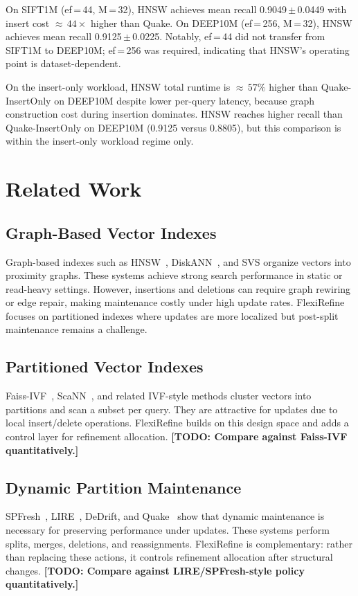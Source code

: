 \documentclass[sigconf, nonacm]{acmart}
\newcommand{\system}{FlexiRefine\xspace}
\newcommand{\quake}{Quake\xspace}
\newcommand{\todo}[1]{\textbf{[TODO: #1]}}
\begin{document}
On SIFT1M (ef\,=\,44, M\,=\,32), HNSW achieves mean recall
0.9049\,$\pm$\,0.0449 with insert cost $\approx\,44\times$ higher
than Quake. On DEEP10M (ef\,=\,256, M\,=\,32), HNSW achieves mean
recall 0.9125\,$\pm$\,0.0225. Notably, ef\,=\,44 did not transfer
from SIFT1M to DEEP10M; ef\,=\,256 was required, indicating that
HNSW's operating point is dataset-dependent.

On the insert-only workload, HNSW total runtime is
$\approx\,57\%$ higher than Quake-InsertOnly on DEEP10M despite lower
per-query latency, because graph construction cost during insertion
dominates. HNSW reaches higher recall than Quake-InsertOnly on
DEEP10M (0.9125 versus 0.8805), but this comparison is within the
insert-only workload regime only.

\section{Related Work}
\label{sec:related}

\subsection{Graph-Based Vector Indexes}
Graph-based indexes such as HNSW~\cite{malkov2018efficient},
DiskANN~\cite{jayaram2019diskann}, and SVS organize vectors into
proximity graphs. These systems achieve strong search performance in
static or read-heavy settings. However, insertions and deletions can
require graph rewiring or edge repair, making maintenance costly under
high update rates. \system focuses on partitioned indexes where updates
are more localized but post-split maintenance remains a challenge.

\subsection{Partitioned Vector Indexes}
Faiss-IVF~\cite{johnson2019billion}, ScaNN~\cite{guo2020accelerating},
and related IVF-style methods cluster vectors into partitions and scan
a subset per query. They are attractive for updates due to local
insert/delete operations. \system builds on this design space and adds
a control layer for refinement allocation. \todo{Compare against Faiss-IVF
quantitatively.}

\subsection{Dynamic Partition Maintenance}
SPFresh~\cite{todo-spfresh}, LIRE~\cite{todo-lire}, DeDrift,
and \quake~\cite{todo-quake} show that dynamic maintenance is necessary
for preserving performance under updates. These systems perform splits,
merges, deletions, and reassignments. \system is complementary: rather
than replacing these actions, it controls refinement allocation after
structural changes. \todo{Compare against LIRE/SPFresh-style policy
quantitatively.}
\end{document}
